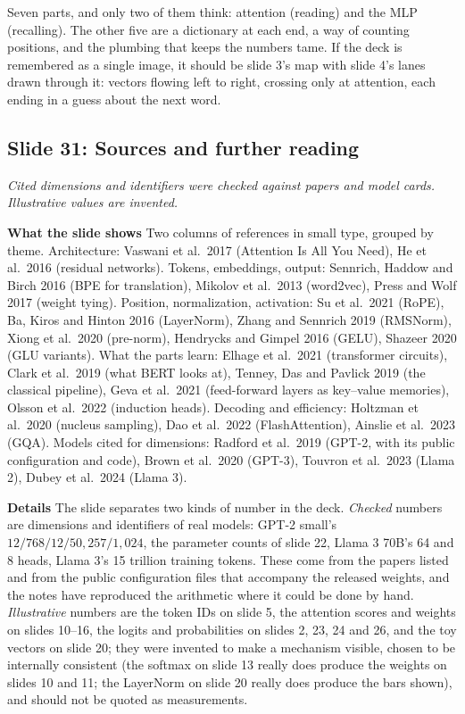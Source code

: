\documentclass[11pt,letterpaper]{article}
\newcommand{\slide}[3]{%
  \subsection[Slide #1: #2]{Slide #1: #2}%
  {\color{muted}\itshape #3\par}\medskip}
\newcommand{\para}[1]{\medskip\noindent\textbf{#1}\quad}
\newenvironment{intuition}{\begin{tcolorbox}[intuitionbox]}{\end{tcolorbox}}
\begin{document}
\begin{intuition}
Seven parts, and only two of them think: attention (reading) and the MLP (recalling). The other five are a dictionary at each end, a way of counting positions, and the plumbing that keeps the numbers tame. If the deck is remembered as a single image, it should be slide 3's map with slide 4's lanes drawn through it: vectors flowing left to right, crossing only at attention, each ending in a guess about the next word.
\end{intuition}

\slide{31}{Sources and further reading}{Cited dimensions and identifiers were checked against papers and model cards. Illustrative values are invented.}

\para{What the slide shows} Two columns of references in small type, grouped by theme. Architecture: Vaswani et al.\ 2017 (Attention Is All You Need), He et al.\ 2016 (residual networks). Tokens, embeddings, output: Sennrich, Haddow and Birch 2016 (BPE for translation), Mikolov et al.\ 2013 (word2vec), Press and Wolf 2017 (weight tying). Position, normalization, activation: Su et al.\ 2021 (RoPE), Ba, Kiros and Hinton 2016 (LayerNorm), Zhang and Sennrich 2019 (RMSNorm), Xiong et al.\ 2020 (pre-norm), Hendrycks and Gimpel 2016 (GELU), Shazeer 2020 (GLU variants). What the parts learn: Elhage et al.\ 2021 (transformer circuits), Clark et al.\ 2019 (what BERT looks at), Tenney, Das and Pavlick 2019 (the classical pipeline), Geva et al.\ 2021 (feed-forward layers as key--value memories), Olsson et al.\ 2022 (induction heads). Decoding and efficiency: Holtzman et al.\ 2020 (nucleus sampling), Dao et al.\ 2022 (FlashAttention), Ainslie et al.\ 2023 (GQA). Models cited for dimensions: Radford et al.\ 2019 (GPT-2, with its public configuration and code), Brown et al.\ 2020 (GPT-3), Touvron et al.\ 2023 (Llama 2), Dubey et al.\ 2024 (Llama 3).

\para{Details} The slide separates two kinds of number in the deck. \emph{Checked} numbers are dimensions and identifiers of real models: GPT-2 small's $12/768/12/50{,}257/1{,}024$, the parameter counts of slide 22, Llama 3 70B's 64 and 8 heads, Llama 3's 15 trillion training tokens. These come from the papers listed and from the public configuration files that accompany the released weights, and the notes have reproduced the arithmetic where it could be done by hand. \emph{Illustrative} numbers are the token IDs on slide 5, the attention scores and weights on slides 10--16, the logits and probabilities on slides 2, 23, 24 and 26, and the toy vectors on slide 20; they were invented to make a mechanism visible, chosen to be internally consistent (the softmax on slide 13 really does produce the weights on slides 10 and 11; the LayerNorm on slide 20 really does produce the bars shown), and should not be quoted as measurements.
\end{document}
